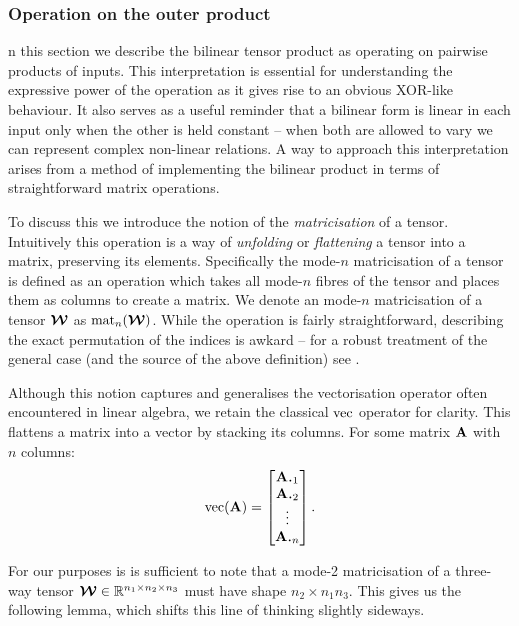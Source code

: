 {\subsubsection{Operation on the outer product}
n this section we describe the bilinear tensor product as operating on pairwise
products of inputs. This interpretation is essential for understanding the expressive
power of the operation as it gives rise to an obvious XOR-like behaviour. It also serves
as a useful reminder that a bilinear form is linear in each input only when the other
is held constant -- when both are allowed to vary we can represent complex non-linear
relations.
A way to approach this interpretation arises from a method of implementing the bilinear 
product in terms of straightforward matrix operations.

To discuss
this we introduce the notion of the \emph{matricisation} of a tensor. Intuitively this
operation is a way of \emph{unfolding} or \emph{flattening} a tensor into a matrix,
preserving its elements. Specifically the mode-\(n\)
matricisation of a tensor is defined as an operation which takes all mode-\(n\) fibres
of the tensor and places them as columns to create a matrix. We denote an mode-\(n\)
matricisation of a tensor \(\bm{\mathcal{W}}\) as \(\operatorname{mat}_n(\bm{\mathcal{W}})\). While the operation is
fairly straightforward, describing the exact permutation of the indices is awkard -- 
for a robust treatment of the general case (and the source of the above definition) see
\autocite{Kolda2009}. 

Although this notion captures and generalises the vectorisation operator often
encountered in linear algebra, we retain the classical \(\operatorname{vec}\) operator for clarity.
This flattens a matrix into a vector by stacking its columns. For some matrix \(\mathbf{A}\) with
\(n\) columns:
\begin{equation}\label{eq:vec}
	\vect(\mat{A}) = \begin{bmatrix}
		\vec{A}_{\midbullet 1}\\
		\vec{A}_{\midbullet 2}\\
		\vdots\\
		\vec{A}_{\midbullet n}
	\end{bmatrix}.
\end{equation}

For our purposes is is sufficient to note that a 
mode-2 matricisation of a
three-way tensor \(\bm{\mathcal{W}} \in \mathbb{R}^{n_1\times n_2\times n_3}\) must have shape
\(n_2 \times n_1n_3\). This gives us the following lemma, which shifts this line of
thinking slightly sideways.

}
